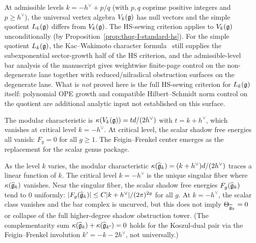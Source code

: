 \begin{remark}
\label{rem:thqg-I-admissible}
At admissible levels $k = -h^\vee + p/q$ (with $p,q$ coprime positive integers and $p \geq h^\vee$), the universal vertex algebra $V_k(\mathfrak{g})$ has null vectors and the simple quotient $L_k(\mathfrak{g})$ differs from $V_k(\mathfrak{g})$. The HS-sewing criterion applies to $V_k(\mathfrak{g})$ unconditionally (by Proposition~\ref{prop:thqg-I-standard-hs}). For the simple quotient $L_k(\mathfrak{g})$, the Kac--Wakimoto character formula~\cite{KW88} still supplies the subexponential sector-growth half of the HS criterion, and the admissible-level bar analysis of the manuscript gives weightwise finite-page control on the non-degenerate lane together with reduced/nilradical obstruction surfaces on the degenerate lane. What is \emph{not} proved here is the full HS-sewing criterion for $L_k(\mathfrak{g})$ itself: polynomial OPE growth and compatible Hilbert--Schmidt norm control on the quotient are additional analytic input not established on this surface.

The modular characteristic is $\kappa(V_k(\mathfrak{g})) = td/(2h^\vee)$ with $t = k + h^\vee$, which vanishes at critical level $k = -h^\vee$. At critical level, the scalar shadow free energies all vanish: $F_g = 0$ for all $g \geq 1$. The Feigin--Frenkel center emerges as the replacement for the scalar genus package.
\end{remark}

\begin{remark}
\label{rem:thqg-I-singular-fibers}
As the level $k$ varies, the modular characteristic $\kappa(\widehat{\mathfrak{g}}_k) = (k+h^\vee)d/(2h^\vee)$ traces a linear function of $k$. The critical level $k = -h^\vee$ is the unique singular fiber where $\kappa(\widehat{\mathfrak{g}}_k)$ vanishes. Near the singular fiber, the scalar shadow free energies $F_g(\widehat{\mathfrak{g}}_k)$ tend to $0$ uniformly: $|F_g(\widehat{\mathfrak{g}}_k)| \leq C |k + h^\vee| / (2\pi)^{2g}$ for all $g$. At $k = -h^\vee$, the scalar class vanishes and the bar complex is uncurved, but this does not imply $\Theta_{\widehat{\mathfrak{g}}_k} = 0$ or collapse of the full higher-degree shadow obstruction tower. (The complementarity sum $\kappa(\widehat{\mathfrak{g}}_k) + \kappa(\widehat{\mathfrak{g}}_{k'}) = 0$ holds for the Koszul-dual pair via the Feigin--Frenkel involution $k' = -k - 2h^\vee$, not universally.)
\end{remark}


